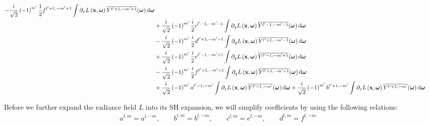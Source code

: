 \begin{align*}
-\frac{i}{\sqrt{2}}\left({-1}\right)^{m'}\frac{1}{2}f^{{l'+1,-m'+1}}\int{\partial_xL\left (\boldsymbol{\mathbf{x}} ,\boldsymbol{\mathbf{\omega}} \right )\overline{Y^{l'+1, -m'+1}}(\boldsymbol{\mathbf{\omega}} )\,\mathrm{d}\boldsymbol{\mathbf{\omega}}}
\\&
+\frac{i}{\sqrt{2}}\left({-1}\right)^{m'}\frac{i}{2}c^{{l'-1,-m'-1}}\int{\partial_yL\left (\boldsymbol{\mathbf{x}} ,\boldsymbol{\mathbf{\omega}} \right )\overline{Y^{l'-1, -m'-1}}(\boldsymbol{\mathbf{\omega}} )\,\mathrm{d}\boldsymbol{\mathbf{\omega}}}
\\&
-\frac{i}{\sqrt{2}}\left({-1}\right)^{m'}\frac{i}{2}d^{{l'+1,-m'-1}}\int{\partial_yL\left (\boldsymbol{\mathbf{x}} ,\boldsymbol{\mathbf{\omega}} \right )\overline{Y^{l'+1, -m'-1}}(\boldsymbol{\mathbf{\omega}} )\,\mathrm{d}\boldsymbol{\mathbf{\omega}}}
\\&
+\frac{i}{\sqrt{2}}\left({-1}\right)^{m'}\frac{i}{2}e^{{l'-1,-m'+1}}\int{\partial_yL\left (\boldsymbol{\mathbf{x}} ,\boldsymbol{\mathbf{\omega}} \right )\overline{Y^{l'-1, -m'+1}}(\boldsymbol{\mathbf{\omega}} )\,\mathrm{d}\boldsymbol{\mathbf{\omega}}}
\\&
-\frac{i}{\sqrt{2}}\left({-1}\right)^{m'}\frac{i}{2}f^{{l'+1,-m'+1}}\int{\partial_yL\left (\boldsymbol{\mathbf{x}} ,\boldsymbol{\mathbf{\omega}} \right )\overline{Y^{l'+1, -m'+1}}(\boldsymbol{\mathbf{\omega}} )\,\mathrm{d}\boldsymbol{\mathbf{\omega}}}
\\&
+\frac{i}{\sqrt{2}}\left({-1}\right)^{m'}a^{{l'-1,-m'}}\int{\partial_zL\left (\boldsymbol{\mathbf{x}} ,\boldsymbol{\mathbf{\omega}} \right )\overline{Y^{l'-1, -m'}}(\boldsymbol{\mathbf{\omega}} )\,\mathrm{d}\boldsymbol{\mathbf{\omega}}}+\frac{i}{\sqrt{2}}\left({-1}\right)^{m'}b^{{l'+1,-m'}}\int{\partial_zL\left (\boldsymbol{\mathbf{x}} ,\boldsymbol{\mathbf{\omega}} \right )\overline{Y^{l'+1, -m'}}(\boldsymbol{\mathbf{\omega}} )\,\mathrm{d}\boldsymbol{\mathbf{\omega}}}
\end{align*}

Before we further expand the radiance field $L$ into its SH expansion, we will simplify coefficients by using the following relations:
\begin{align}
a^{l,m} = a^{l,-m}, \qquad
b^{l,m} = b^{l,-m}, \qquad
c^{l,m} = e^{l,-m}, \qquad
d^{l,m} = f^{l,-m}
\label{eq:recursion_identities}
\end{align}

